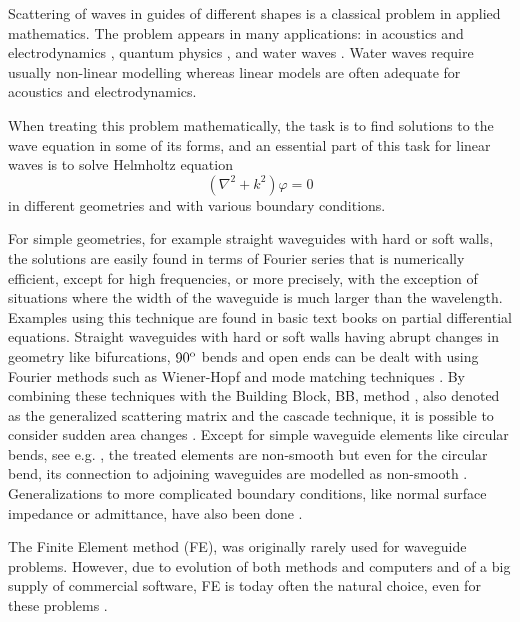 \documentclass{svjour3}
\renewcommand{\phi}{\varphi}
\begin{document}
Scattering of waves in guides of different shapes is a classical
problem in applied mathematics. The problem appears in many
applications: in acoustics and electrodynamics
\cite{jones1986,jin:2010}, quantum physics
\cite{londegan+carini+murdock:1999}, and water waves
\cite{abbott:1956,aimen+michelle+theodore:1998}. Water waves require
usually non-linear modelling whereas linear models are often adequate
for acoustics and electrodynamics.

When treating this problem mathematically, the task is to find
solutions to the wave equation in some of its forms, and an essential
part of this task for linear waves is to solve Helmholtz equation
\begin{equation}
  \label{eq:Helmholtz1}
  (\nabla^2+k^2)\phi=0
\end{equation}
in different geometries and with various boundary conditions.

For simple geometries, for example straight waveguides with hard or
soft walls, the solutions are easily found in terms of Fourier series
that is numerically efficient, except for high frequencies, or more
precisely, with the exception of situations where the width of the
waveguide is much larger than the wavelength. Examples using this
technique are found in basic text books on partial differential
equations. Straight waveguides with hard or soft walls having abrupt
changes in geometry like bifurcations, $90^{\tiny{\rm o}}$ bends and
open ends can be dealt with using Fourier methods such as Wiener-Hopf
and mode matching techniques \cite{mittralee1971}. By combining these
techniques with the Building Block, BB, method
\cite{nilssonbrander1981b}, also denoted as the generalized scattering
matrix \cite{mittralee1971} and the cascade \cite{jones1986}
technique, it is possible to consider sudden area changes
\cite{mittralee1971,nilssonbrander1981b}. Except for simple waveguide
elements like circular bends, see e.g. \cite{bironilsson2005}, the
treated elements are non-smooth but even for the circular bend, its
connection to adjoining waveguides are modelled as non-smooth
\cite{bironilsson2005}. Generalizations to more complicated boundary
conditions, like normal surface impedance or admittance, have also
been done \cite{buyukaksoycinar2005}.

The Finite Element method (FE), was originally rarely used for
waveguide problems. However, due to evolution of both methods and
computers and of a big supply of commercial software, FE is today often
the natural choice, even for these problems
\cite{zienkiewicz+taylor+zhu:2008,Ihlenburg:1998}.
\end{document}
